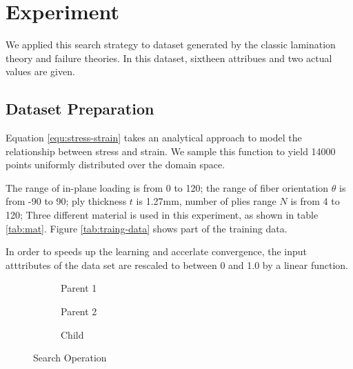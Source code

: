 \section{Experiment}
We applied this search strategy to dataset generated by the classic lamination
theory and failure theories. In this dataset, sixtheen attribues and two actual
values are given.
\subsection{Dataset Preparation}
Equation \ref{equ:stress-strain} takes an analytical approach to model the
relationship between stress and strain. We sample this function to yield 14000 points
uniformly distributed over the domain space.

The range of in-plane loading is from 0 to 120; the range of fiber orientation $\theta$ is from
-90 to 90; ply thickness $t$ is 1.27mm, number of plies range $N$ is from 4 to 120;
Three different material is used in this experiment, as shown in table \ref{tab:mat}.
Figure \ref{tab:traing-data} shows part of the training data.

In order to speeds up the learning and accerlate convergence, the input
atttributes of the data set are rescaled to between 0 and 1.0 by a linear function.




\begin{figure}[h!]
	\centering
	\begin{subfigure}[b]{1.0\linewidth}
		\centering
		
		\caption{Parent 1}
		\label{fig:p1}
	\end{subfigure}
	\newline
	\begin{subfigure}[b]{1.0\linewidth}
		\centering
		
		\caption{Parent 2}
		\label{fig:p2}
	\end{subfigure}
	\newline
	\begin{subfigure}[b]{1.0\linewidth}
		\centering
		
		\caption{Child}
		\label{fig:child}
	\end{subfigure}
	\caption{Search Operation}
	\label{fig:search}
\end{figure}

